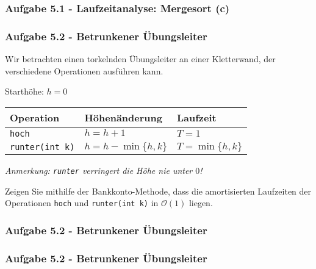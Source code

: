 \documentclass{beamer}
\begin{document}
\begin{frame}
	\frametitle{Aufgabe 5.1 - Laufzeitanalyse: Mergesort (c)}
\end{frame}

\begin{frame}
	\frametitle{Aufgabe 5.2 - Betrunkener Übungsleiter}

	Wir betrachten einen torkelnden Übungsleiter an einer Kletterwand, der verschiedene Operationen ausführen kann.

	\bigskip

	Starthöhe: $h = 0$
	\renewcommand{\arraystretch}{1.3}
	\begin{table}[]
		\begin{tabular}{lll}
			Operation                        & Höhenänderung          & Laufzeit           \\
			\hline
			\texttt{hoch}          & $h = h + 1$            & $T = 1$            \\
			\texttt{runter(int k)} & $h = h - \min\{h, k\}$ & $T = \min\{h, k\}$
		\end{tabular}
	\end{table}

	{\small \textit{Anmerkung: \texttt{runter} verringert die Höhe nie unter $0$!}}

	\bigskip

	Zeigen Sie mithilfe der Bankkonto-Methode, dass die amortisierten Laufzeiten der Operationen
	\texttt{hoch} und \texttt{runter(int k)} in $\mathcal{O}(1)$ liegen.
\end{frame}

\begin{frame}
	\frametitle{Aufgabe 5.2 - Betrunkener Übungsleiter}
\end{frame}

\begin{frame}
	\frametitle{Aufgabe 5.2 - Betrunkener Übungsleiter}
\end{frame}
\end{document}
